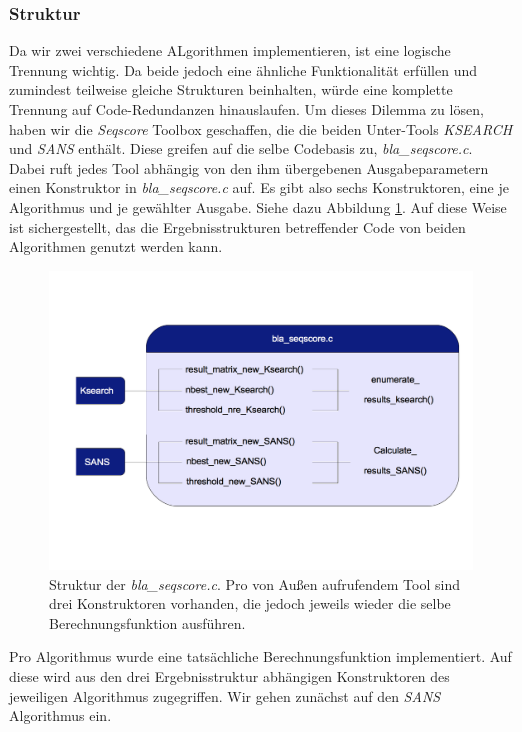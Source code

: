 \documentclass{article}
\begin{document}
\subsubsection{Struktur}

Da wir zwei verschiedene ALgorithmen implementieren, ist eine logische Trennung wichtig. Da beide jedoch eine ähnliche Funktionalität erfüllen und
zumindest teilweise gleiche Strukturen beinhalten, würde eine komplette Trennung auf Code-Redundanzen hinauslaufen. Um dieses Dilemma zu lösen, haben wir
die \emph{Seqscore} Toolbox geschaffen, die die beiden Unter-Tools \emph{KSEARCH} und \emph{SANS} enthält. Diese greifen auf die selbe Codebasis zu, 
\emph{bla\_seqscore.c}. Dabei ruft jedes Tool abhängig von den ihm übergebenen Ausgabeparametern einen Konstruktor in \emph{bla\_seqscore.c} auf. Es gibt also
sechs Konstruktoren, eine je Algorithmus und je gewählter Ausgabe. Siehe dazu Abbildung \ref{seqsc}. Auf diese Weise ist sichergestellt, das die 
Ergebnisstrukturen betreffender Code von beiden Algorithmen genutzt werden kann.

\begin{center}
  \begin{figure}
    \includegraphics[width = \linewidth]{img/dia2}
    \caption{Struktur der \emph{bla\_seqscore.c}. Pro von Außen aufrufendem Tool sind drei Konstruktoren vorhanden, die jedoch jeweils wieder die
    selbe Berechnungsfunktion ausführen.}
    \label{seqsc}
  \end{figure}
\end{center}

Pro Algorithmus wurde eine tatsächliche Berechnungsfunktion implementiert. Auf diese wird aus den drei Ergebnisstruktur abhängigen Konstruktoren des jeweiligen
Algorithmus zugegriffen. Wir gehen zunächst auf den \emph{SANS} Algorithmus ein.
\end{document}
